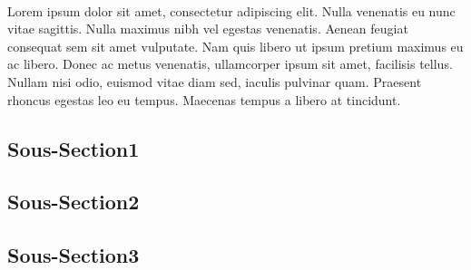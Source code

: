 \documentclass[../main.tex]{subfiles}
\begin{document}
\paragraph{}
Lorem ipsum dolor sit amet, consectetur adipiscing elit. Nulla venenatis eu nunc vitae sagittis. Nulla maximus nibh vel egestas venenatis. Aenean feugiat consequat sem sit amet vulputate. Nam quis libero ut ipsum pretium maximus eu ac libero. Donec ac metus venenatis, ullamcorper ipsum sit amet, facilisis tellus. Nullam nisi odio, euismod vitae diam sed, iaculis pulvinar quam. Praesent rhoncus egestas leo eu tempus. Maecenas tempus a libero at tincidunt.

\subsection{Sous-Section1} 



\subsection{Sous-Section2} 



\subsection{Sous-Section3} 

\end{document}
